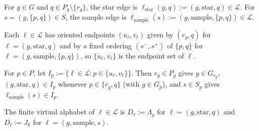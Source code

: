 \begin{definition}
    \label{def:compression_operator_edges}
    \leanok
    For $g\in G$ and $q\in P_g\setminus\{r_g\}$, the star edge is $\ell_{\mathrm{star}}(g,q):=(g,\mathrm{star},q)\in\mathcal L$. For $s=(g,\{p,q\})\in S$, the sample edge is $\ell_{\mathrm{sample}}(s):=(g,\mathrm{sample},\{p,q\})\in\mathcal L$.
\end{definition}

\begin{definition}
    \label{def:compression_operator_endpoints}
    \leanok
    Each $\ell\in\mathcal L$ has oriented endpoints $(u_\ell,v_\ell)$ given by $(r_g,q)$ for $\ell=(g,\mathrm{star},q)$ and by a fixed ordering $(s^-,s^+)$ of $\{p,q\}$ for $\ell=(g,\mathrm{sample},\{p,q\})$, so $\{u_\ell,v_\ell\}$ is the endpoint set of $\ell$.
\end{definition}

\begin{definition}
    \label{def:compression_operator_incidences}
    \leanok
    For $p\in P$, let $I_p:=\{\ell\in\mathcal L:p\in\{u_\ell,v_\ell\}\}$. Then $r_g\in P_g$ gives $g\in G_{r_g}$, $(g,\mathrm{star},q)\in I_p$ whenever $p\in\{r_g,q\}$ (with $g\in G_p$), and $s\in S_p$ gives $\ell_{\mathrm{sample}}(s)\in I_p$.
\end{definition}

\begin{definition}
    \label{def:compression_operator_alphabets}
    \leanok
    The finite virtual alphabet of $\ell\in\mathcal L$ is $D_\ell:=\Lambda_g$ for $\ell=(g,\mathrm{star},q)$ and $D_\ell:=J_k$ for $\ell=(g,\mathrm{sample},s)$.
\end{definition}

